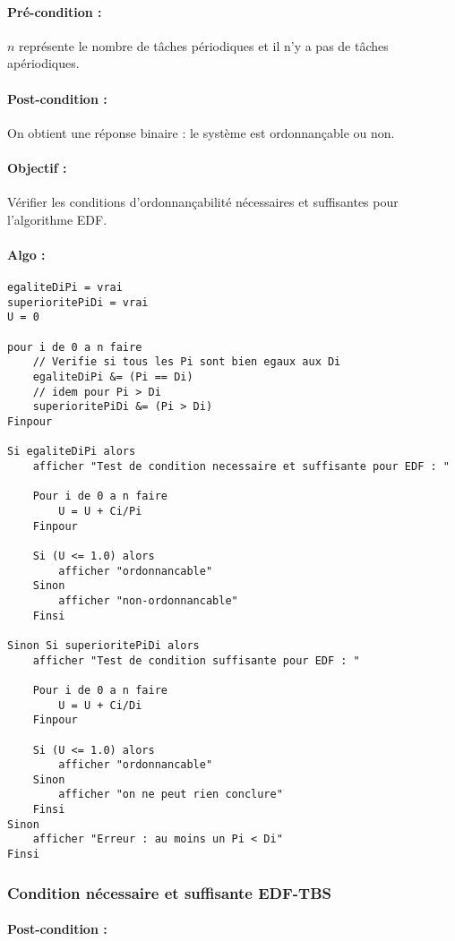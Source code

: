 				\paragraph{Pré-condition :} $n$ représente le nombre de tâches périodiques et il n'y a pas de tâches apériodiques.
				\paragraph{Post-condition :} On obtient une réponse binaire : le système est ordonnançable ou non.
				\paragraph{Objectif :} Vérifier les conditions d'ordonnançabilité nécessaires et suffisantes pour l'algorithme EDF.
				\paragraph{Algo :} 
					\begin{lstlisting}[mathescape]
egaliteDiPi = vrai					
superioritePiDi = vrai
U = 0		
			
pour i de 0 a n faire
    // Verifie si tous les Pi sont bien egaux aux Di
	egaliteDiPi &= (Pi == Di) 
	// idem pour Pi > Di
	superioritePiDi &= (Pi > Di) 
Finpour

Si egaliteDiPi alors
	afficher "Test de condition necessaire et suffisante pour EDF : "

    Pour i de 0 a n faire
	    U = U + Ci/Pi
    Finpour
	
	Si (U <= 1.0) alors
		afficher "ordonnancable"
	Sinon
		afficher "non-ordonnancable"
	Finsi
	
Sinon Si superioritePiDi alors
	afficher "Test de condition suffisante pour EDF : "
    
    Pour i de 0 a n faire
	    U = U + Ci/Di
    Finpour
	
	Si (U <= 1.0) alors
		afficher "ordonnancable"
	Sinon
		afficher "on ne peut rien conclure"
	Finsi
Sinon
    afficher "Erreur : au moins un Pi < Di"
Finsi
					\end{lstlisting}
					
			\subsubsection{Condition nécessaire et suffisante EDF-TBS}
				\paragraph{Post-condition :} 

